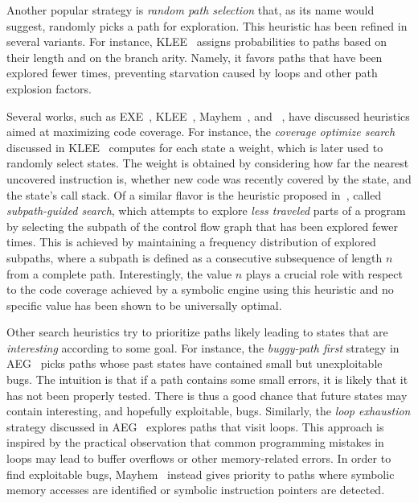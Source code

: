 Another popular strategy is {\em random path selection} that, as its name would suggest, randomly picks a path for exploration. This heuristic has been refined in several variants. For instance, {\sc KLEE}~\cite{KLEE-OSDI08} assigns probabilities to paths based on their length and on the branch arity. Namely, it favors paths that have been explored fewer times, preventing starvation caused by loops and other path explosion factors.

Several works, such as {\sc EXE}~\cite{EXE-CCS06}, {\sc KLEE}~\cite{KLEE-OSDI08}, {\sc Mayhem}~\cite{MAYHEM-SP12}, and {\sc \stwoe}~\cite{CKC-TOCS12}, have discussed heuristics aimed at maximizing code coverage. For instance, the {\em coverage optimize search} discussed in {\sc KLEE}~\cite{KLEE-OSDI08} computes for each state a weight, which is later used to randomly select states. The weight is obtained by considering how far the nearest uncovered instruction is, whether new code was recently covered by the state, and the state's call stack. Of a similar flavor is the heuristic proposed in~\cite{LZL-OOPSLA13}, called {\em subpath-guided search}, which attempts to explore {\it less traveled} parts of a program by selecting the subpath of the control flow graph that has been explored fewer times. This is achieved by maintaining a frequency distribution of explored subpaths, where a subpath is defined as a consecutive subsequence of length $n$ from a complete path. Interestingly, the value $n$ plays a crucial role with respect to the code coverage achieved by a symbolic engine using this heuristic and no specific value has been shown to be universally optimal.

Other search heuristics try to prioritize paths likely leading to states that are {\em interesting} according to some goal. For instance, the {\em buggy-path first} strategy in {\sc AEG}~\cite{AEG-NDSS11} picks paths whose past states have contained small but unexploitable bugs. The intuition is that if a path contains some small errors, it is likely that it has not been properly tested. There is thus a good chance that future states may contain interesting, and hopefully exploitable, bugs. Similarly, the {\em loop exhaustion} strategy discussed in {\sc AEG}~\cite{AEG-NDSS11} explores paths that visit loops. This approach is inspired by the practical observation that common programming mistakes in loops may lead to buffer overflows or other memory-related errors. In order to find exploitable bugs, {\sc Mayhem}~\cite{MAYHEM-SP12} instead gives priority to paths where symbolic memory accesses are identified or symbolic instruction pointers are detected. 

